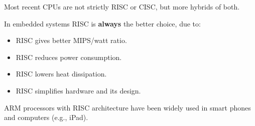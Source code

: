 Most recent CPUs are not strictly RISC or CISC, but more hybrids of both.

In embedded systems RISC is \textbf{always} the better choice, due to:
\begin{itemize}
\item RISC gives better MIPS/watt ratio.
\item RISC reduces power consumption.
\item RISC lowers heat dissipation.
\item RISC simplifies hardware and its design.
\end{itemize}

ARM processors with RISC architecture have been widely used in smart phones and computers (e.g., iPad).

